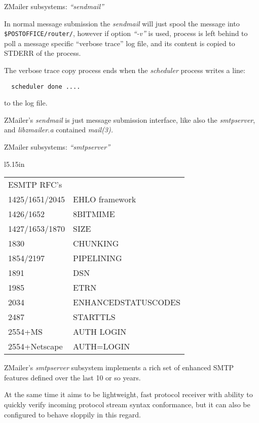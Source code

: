 \documentclass[a4paper,landscape]{slides}
\newcommand{\ZM}{ZMailer}
\begin{document}
\begin{slide}

\centerline{\large \ZM{} subsystems: {\it ``sendmail''}}

In normal message submission the {\it sendmail} will just spool
the message into \verb!$POSTOFFICE/router/!, however if option
{\it ``-v''} is used, process is left behind to poll a message
specific ``verbose trace'' log file, and its content is copied
to STDERR of the process.

The verbose trace copy process ends when the {\it scheduler}
process writes a line:
\begin{verbatim}
  scheduler done ....
\end{verbatim}
to the log file.

\ZM's {\it sendmail} is just message submission interface, like
also the {\it smtpserver}, and  {\it libzmailer.a}  contained
{\it mail(3).}

\vfill

\end{slide}



\begin{slide}

\centerline{\large \ZM{} subsystems: {\it ``smtpserver''}}

\begin{wrapfigure}[12]{l}{5.15in}
\tiny
\begin{tabular}{ll}
ESMTP RFC's \\

1425/1651/2045 & EHLO framework \\
1426/1652 & 8BITMIME \\
1427/1653/1870 & SIZE \\
1830 & CHUNKING \\
1854/2197 & PIPELINING \\
1891 & DSN \\
1985 & ETRN \\
2034 & ENHANCEDSTATUSCODES \\
2487 & STARTTLS \\
2554+MS & AUTH LOGIN \\
2554+Netscape & AUTH=LOGIN
\end{tabular}
\end{wrapfigure}
\ZM's {\it smtpserver} subsystem implements a rich set of enhanced SMTP
features defined over the last 10 or so years.

At the same time it aims to be lightweight, fast protocol receiver with
ability to quickly verify incoming protocol stream syntax conformance,
but it can also be configured to behave sloppily in this regard.

\vfill

\end{slide}
\end{document}
